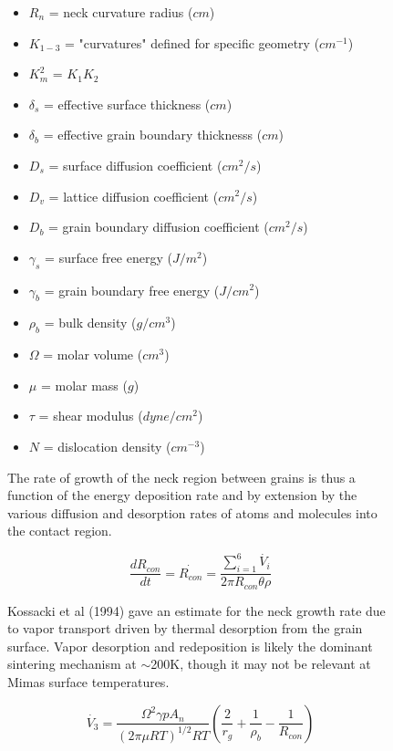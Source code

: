 \documentclass[11pt]{article} %
\begin{document}
\begin{figure}[ht]
\begin{Table}
	\begin{itemize}
	\item	$R_{n}$ = neck curvature radius ($cm$) 
	\item	$K_{1-3}$ = "curvatures" defined for specific geometry ($cm^{-1}$) 
	\item	$K_{m}^{2}$ = $K_{1}K_{2}$ 
	\item	$\delta_{s}$ = effective surface thickness ($cm$) 
	\item	$\delta_{b}$ = effective grain boundary thicknesss ($cm$) 
	\item	$D_{s}$ = surface diffusion coefficient ($cm^{2}/s$) 
	\item	$D_{v}$ = lattice diffusion coefficient ($cm^{2}/s$) 
	\item	$D_{b}$ = grain boundary diffusion coefficient ($cm^{2}/s$) 
	\item	$\gamma_{s}$ = surface free energy ($J/m^{2}$) 
	\item	$\gamma_{b}$ = grain boundary free energy ($J/cm^{2}$) 
	\item	$\rho_{b}$ = bulk density ($g/cm^{3}$) 
	\item	$\Omega$ = molar volume ($cm^{3}$) 
	\item	$\mu$ = molar mass ($g$)  
	\item	$\tau$ = shear modulus ($dyne/cm^{2}$) 
	\item	$N$ = dislocation density ($cm^{-3}$) 
	\end{itemize}
	
	The rate of growth of the neck region between grains is thus a function of the energy deposition rate and by extension by the various diffusion and desorption rates of atoms and molecules into the contact region.
	
	\begin{equation}
	\frac{dR_{con}}{dt} = \dot{R_{con}} = \frac{\sum_{i=1}^{6} \dot{V_{i}}}{2\pi R_{con} \theta \rho}
	\end{equation}
	
	Kossacki et al (1994) gave an estimate for the neck growth rate due to vapor transport driven by thermal desorption from the grain surface. Vapor desorption and redeposition is likely the dominant sintering mechanism at $\sim$200K, though it may not be relevant at Mimas surface temperatures.
	
	\begin{equation}
	\dot{V_{3}} = \frac{\Omega^{2}\gamma p A_{n}}{(2\pi\mu RT)^{1/2}RT} \left( \frac{2}{r_{g}} + \frac{1}{\rho_{b}} - \frac{1}{R_{con}} \right)
	\end{equation}
	

\end{Table}
\end{figure}
\end{document}
